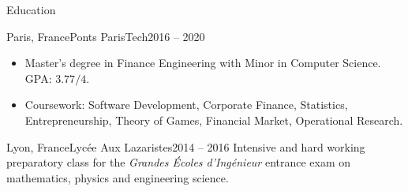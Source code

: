 \documentclass[]{mcdowellcv}
\begin{document}
    \begin{cvsection}{Education}

        \begin{cvsubsection}{Paris, France}{Ponts ParisTech}{2016 -- 2020}
            \begin{itemize}
                \item Master's degree in Finance Engineering with Minor in Computer Science. GPA: \(3.77 / 4\).
                \item Coursework: Software Development, Corporate Finance, Statistics, Entrepreneurship, Theory of Games, Financial Market, Operational Research.
            \end{itemize}
        \end{cvsubsection}

        \begin{cvsubsection}{Lyon, France}{Lyc\'ee Aux Lazaristes}{2014 -- 2016}
            Intensive and hard working preparatory class for the \textit{Grandes \'Ecoles d'Ing\'enieur} entrance exam on mathematics, physics and engineering science.
        \end{cvsubsection}

    \end{cvsection}
\end{document}
